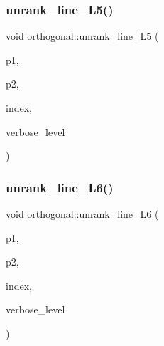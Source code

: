 \subsubsection{\texorpdfstring{unrank\+\_\+line\+\_\+\+L5()}{unrank\_line\_L5()}}
{\footnotesize\ttfamily void orthogonal\+::unrank\+\_\+line\+\_\+\+L5 (\begin{DoxyParamCaption}\item[{\mbox{\hyperlink{galois_8h_a09fddde158a3a20bd2dcadb609de11dc}{I\+NT}} \&}]{p1,  }\item[{\mbox{\hyperlink{galois_8h_a09fddde158a3a20bd2dcadb609de11dc}{I\+NT}} \&}]{p2,  }\item[{\mbox{\hyperlink{galois_8h_a09fddde158a3a20bd2dcadb609de11dc}{I\+NT}}}]{index,  }\item[{\mbox{\hyperlink{galois_8h_a09fddde158a3a20bd2dcadb609de11dc}{I\+NT}}}]{verbose\+\_\+level }\end{DoxyParamCaption})}

\mbox{\label{classorthogonal_a91145776fc4185d7277ddf019064f7ea}} 
\subsubsection{\texorpdfstring{unrank\+\_\+line\+\_\+\+L6()}{unrank\_line\_L6()}}
{\footnotesize\ttfamily void orthogonal\+::unrank\+\_\+line\+\_\+\+L6 (\begin{DoxyParamCaption}\item[{\mbox{\hyperlink{galois_8h_a09fddde158a3a20bd2dcadb609de11dc}{I\+NT}} \&}]{p1,  }\item[{\mbox{\hyperlink{galois_8h_a09fddde158a3a20bd2dcadb609de11dc}{I\+NT}} \&}]{p2,  }\item[{\mbox{\hyperlink{galois_8h_a09fddde158a3a20bd2dcadb609de11dc}{I\+NT}}}]{index,  }\item[{\mbox{\hyperlink{galois_8h_a09fddde158a3a20bd2dcadb609de11dc}{I\+NT}}}]{verbose\+\_\+level }\end{DoxyParamCaption})}

\mbox{\label{classorthogonal_a6dbd5481e532a8f7232acded49f5c05e}} 
